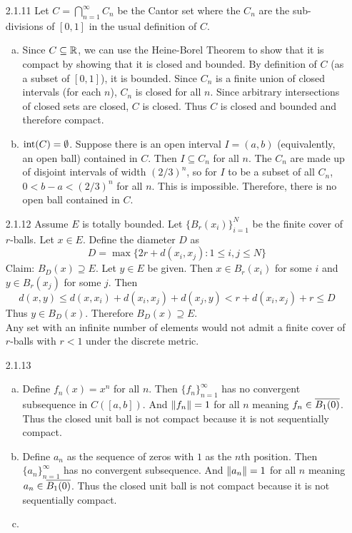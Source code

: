 \documentclass[../../Solutions.tex]{subfiles}
\begin{document}
\begin{itemize}
	\item [2.1.11] Let $C = \bigcap_{n=1}^\infty C_n$ be the Cantor set where the $C_n$ are the sub-divisions of $[0,1]$ in the usual definition of $C$.
	\begin{enumerate}[(a)]
		\item Since $C \subseteq \mathbb{R}$, we can use the Heine-Borel Theorem to show that it is compact by showing that it is closed and bounded.
			By definition of $C$ (as a subset of $[0,1]$), it is bounded.
			Since $C_n$ is a finite union of closed intervals (for each $n$), $C_n$ is closed for all $n$.
			Since arbitrary intersections of closed sets are closed, $C$ is closed.
			Thus $C$ is closed and bounded and therefore compact.
		\item $\text{int}(C)=\emptyset$.
			Suppose there is an open interval $I = (a,b)$ (equivalently, an open ball) contained in $C$.
			Then $I \subseteq C_n$ for all $n$.
			The $C_n$ are made up of disjoint intervals of width $(2/3)^n$, so for $I$ to be a subset of all $C_n$, $0 < b-a < (2/3)^n$ for all $n$.
			This is impossible.
			Therefore, there is no open ball contained in $C$.
	\end{enumerate}
	
	\item [2.1.12] Assume $E$ is totally bounded.
		Let $\{ B_{r}(x_i) \}_{i=1}^N$ be the finite cover of $r$-balls.
		Let $x \in E$.
		Define the diameter $D$ as
		$$ D = \max\{ 2r + d(x_i , x_j) : 1 \leq i,j \leq N \} $$
		Claim: $B_D(x) \supseteq E$.
		Let $y \in E$ be given.
		Then $x \in B_r(x_i)$ for some $i$ and $y \in B_r(x_j)$ for some $j$.
		Then
		$$ d(x,y) \leq d(x,x_i) + d(x_i,x_j) + d(x_j,y) < r + d(x_i,x_j) + r \leq D $$
		Thus $y \in B_D(x)$.
		Therefore $B_D(x) \supseteq E$. \\
		Any set with an infinite number of elements would not admit a finite cover of $r$-balls with $r < 1$ under the discrete metric.
	
	\item [2.1.13]
	\begin{enumerate}[(a)]
		\item Define $f_n(x) = x^n$ for all $n$.
			Then $\{f_n\}_{n=1}^\infty$ has no convergent subsequence in $C([a,b])$.
			And $\left\lVert f_n\right\rVert = 1$ for all $n$ meaning $f_n \in \overline{B_1(0)}$.
			Thus the closed unit ball is not compact because it is not sequentially compact.
		\item Define $a_n$ as the sequence of zeros with $1$ as the $n$th position.
			Then $\{a_n\}_{n=1}^\infty$ has no convergent subsequence.
			And $\left\lVert a_n\right\rVert = 1$ for all $n$ meaning $a_n \in \overline{B_1(0)}$.
			Thus the closed unit ball is not compact because it is not sequentially compact.
		\item %
	\end{enumerate}
	

\end{itemize}
\end{document}
